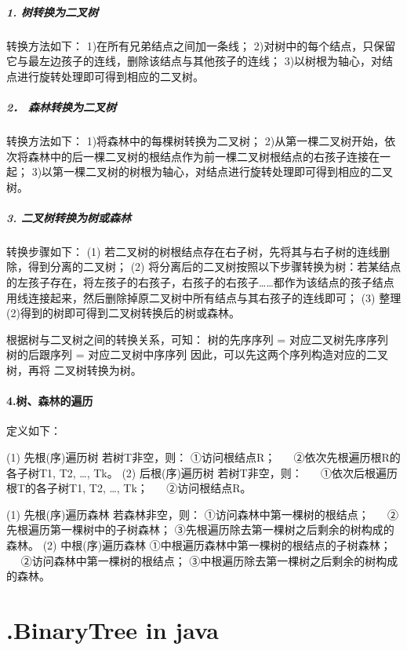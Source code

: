 \documentclass[UTF8]{ctexart}
\begin{document}
\subparagraph{1. 树转换为二叉树}
转换方法如下：
	1)在所有兄弟结点之间加一条线；
	2)对树中的每个结点，只保留它与最左边孩子的连线，删除该结点与其他孩子的连线；
	3)以树根为轴心，对结点进行旋转处理即可得到相应的二叉树。


\subparagraph{2． 森林转换为二叉树}
转换方法如下：
	1)将森林中的每棵树转换为二叉树；
	2)从第一棵二叉树开始，依次将森林中的后一棵二叉树的根结点作为前一棵二叉树根结点的右孩子连接在一起；
	3)以第一棵二叉树的树根为轴心，对结点进行旋转处理即可得到相应的二叉树。


\subparagraph{3. 二叉树转换为树或森林}
转换步骤如下：
	(1) 若二叉树的树根结点存在右子树，先将其与右子树的连线删除，得到分离的二叉树；
	(2) 将分离后的二叉树按照以下步骤转换为树：若某结点的左孩子存在，将左孩子的右孩子，右孩子的右孩子……都作为该结点的孩子结点用线连接起来，然后删除掉原二叉树中所有结点与其右孩子的连线即可；
	(3) 整理(2)得到的树即可得到二叉树转换后的树或森林。

根据树与二叉树之间的转换关系，可知：
树的先序序列 = 对应二叉树先序序列
树的后跟序列 = 对应二叉树中序序列
因此，可以先这两个序列构造对应的二叉树，再将
二叉树转换为树。


\paragraph{4.树、森林的遍历}

定义如下：

(1) 先根(序)遍历树
		若树T非空，则：
		①访问根结点R；
　		②依次先根遍历根R的各子树T1, T2, …, Tk。
(2) 后根(序)遍历树
		若树T非空，则：
　		①依次后根遍历根T的各子树T1, T2, …, Tk；
　		②访问根结点R。

	(1) 先根(序)遍历森林
		若森林非空，则：
		①访问森林中第一棵树的根结点；
　		②先根遍历第一棵树中的子树森林；
		③先根遍历除去第一棵树之后剩余的树构成的森林。
	(2) 中根(序)遍历森林
		①中根遍历森林中第一棵树的根结点的子树森林；
　		②访问森林中第一棵树的根结点；
		③中根遍历除去第一棵树之后剩余的树构成的森林。





\newpage
\section*{.BinaryTree in java}

\end{document}
